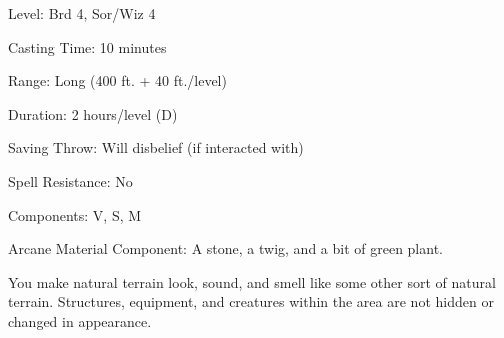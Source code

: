 
\begin{description*}
\item[Level:] Brd 4, Sor/Wiz 4
\item[Casting Time:] 10 minutes
\item[Range:] Long (400 ft. + 40 ft./level)
\item[Duration:] 2 hours/level (D)
\item[Saving Throw:] Will disbelief (if interacted with)
\item[Spell Resistance:] No
\item[Components:] V, S, M
\item[Arcane Material Component:] A stone, a twig, and a bit of green plant.
\end{description*}

You make natural terrain look, sound, and smell like some other sort of natural
terrain. Structures, equipment, and creatures within the area are not hidden or
changed in appearance.